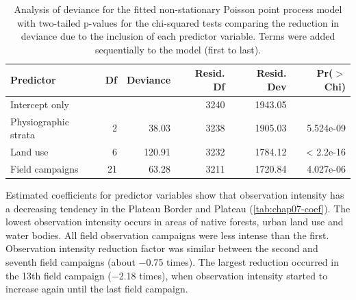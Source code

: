 \begin{table}[!ht]
\caption[Analysis of deviance for the fitted non-stationary Poisson point process model.]{Analysis of deviance 
for the fitted non-stationary Poisson point process model with two-tailed p-values for the chi-squared tests 
comparing the reduction in deviance due to the inclusion of each predictor variable. Terms were added 
sequentially to the model (first to last).}
 \label{tab:chap07-deviance}
 \centering\footnotesize
 \begin{tabular}{lrrrrr}
  \hline
  Predictor		& Df	& Deviance	& Resid. Df	& Resid. Dev	& Pr($>$Chi)	\\ 
  \hline
  Intercept only	&  	&  		& 3240 		& 1943.05 	&  		\\ 
  Physiographic strata	& 2 	& 38.03 	& 3238 		& 1905.03 	& 5.524e-09 	\\ 
  Land use		& 6 	& 120.91 	& 3232 		& 1784.12 	& < 2.2e-16 	\\ 
  Field campaigns	& 21 	& 63.28 	& 3211 		& 1720.84 	& 4.027e-06 	\\ 
  \hline
 \end{tabular}
\end{table}

Estimated coefficients for predictor variables show that observation intensity has a decreasing tendency in the
Plateau Border and Plateau (\autoref{tab:chap07-coef}). The lowest observation intensity occurs in areas of 
native forests, urban land use and water bodies. All field observation campaigns were less intense than the 
first. Observation intensity reduction factor was similar between the second and seventh field campaigns 
(about \num{-0.75} times). The largest reduction occurred in the \num{13}th field campaign (\num{-2.18} 
times), 
when observation intensity started to increase again until the last field campaign.

